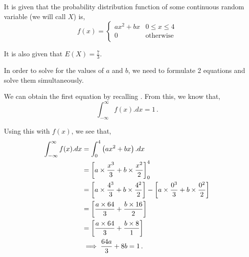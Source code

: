 %
%


\begin{subquestions}
	
\subquestion
It is given that the probability distribution function of some continuous random variable (we will call $X$) is,
\[
f(x) =
\begin{cases}
	ax^2+bx & \text{$0 \leq x \leq 4$} \\
	0       & \text{otherwise} \\
\end{cases}
\]	

It is also given that $E(X) = \frac{7}{3}$. 
\begin{subsubquestions}
	
\subsubquestion
	
In order to solve for the values of $a$ and $b$, we need to formulate 2 equations and solve them simultaneously. 

We can obtain the first equation by recalling . From this, we know that,
\begin{equation}
	\int_{-\infty}^{\infty} f(x).dx = 1 \,.
\end{equation}	
	
Using this with $f(x)$, we see that,
\begin{align}
	\int_{-\infty}^{\infty} f(x).dx & = \int_{0}^{4} \left(ax^2 + bx \right).dx \nonumber \\
	                                & = \left[a \times \frac{x^3}{3} + b \times \frac{x^2}{2}\right]^{4}_{0} \nonumber \\
	                                & = \left[a \times \frac{4^3}{3} + b \times \frac{4^2}{2}\right] - \left[a \times \frac{0^3}{3} + b \times \frac{0^2}{2}\right] \nonumber \\
	                                & = \left[\frac{a \times 64}{3} + \frac{b \times 16}{2}\right] \nonumber \\
	                                & = \left[\frac{a \times 64}{3} + \frac{b \times 8}{1}\right] \nonumber \\
	                                & \implies \frac{64a}{3} + 8b = 1 \,. \label{2012:q3:CRV1}           
\end{align}


\end{subsubquestions}
\end{subquestions}
